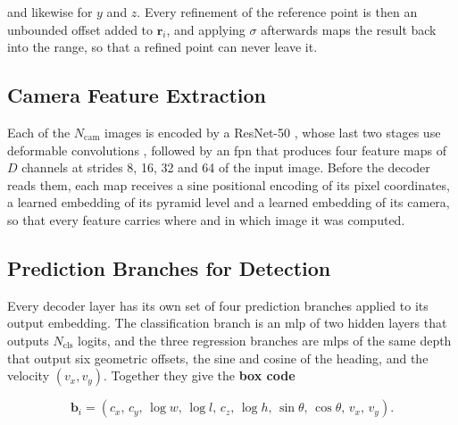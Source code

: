 and likewise for $y$ and $z$. Every refinement of the reference point is then an unbounded offset added to
$\mathbf{r}_i$, and applying $\sigma$ afterwards maps the result back into the range, so that a refined point
can never leave it.


\subsection{Camera Feature Extraction}
\label{subsec:design-camera}

Each of the $N_{\mathrm{cam}}$ images is encoded by a ResNet-50 \cite{He2016ResNet}, whose last two stages
use deformable convolutions \cite{Zhu2019DCNv2}, followed by an \ac{fpn} \cite{Lin2017FPN} that produces four
feature maps of $D$ channels at strides 8, 16, 32 and 64 of the input image. Before the decoder reads them,
each map receives a sine positional encoding of its pixel coordinates, a learned embedding of its pyramid
level and a learned embedding of its camera, so that every feature carries where and in which image it was
computed.

\subsection{Prediction Branches for Detection}
\label{subsec:design-branches}

Every decoder layer has its own set of four prediction branches applied to its output embedding. The
classification branch is an \ac{mlp} of two hidden layers that outputs $N_{\mathrm{cls}}$ logits, and the
three regression branches are \acp{mlp} of the same depth that output six geometric offsets, the sine and
cosine of the heading, and the velocity $(v_x, v_y)$. Together they give the \textbf{box code}

\begin{equation}
\mathbf{b}_i = \left( c_x,\, c_y,\, \log w,\, \log l,\, c_z,\, \log h,\, \sin\theta,\, \cos\theta,\,
v_x,\, v_y \right).
    \label{eq:design-boxcode}
\end{equation}


